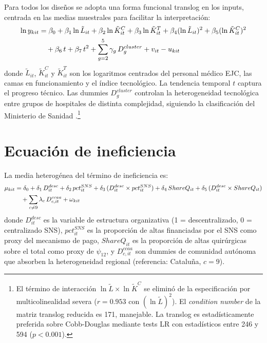 Para todos los diseños se adopta una forma funcional translog en los inputs, centrada en las medias muestrales para facilitar la interpretación:
\begin{align}
  \ln y_{kit} &= \beta_0
    + \beta_1 \ln\tilde{L}_{it}
    + \beta_2 \ln\tilde{K}^C_{it}
    + \beta_3 \ln\tilde{K}^T_{it}
    + \beta_4 (\ln\tilde{L}_{it})^2
    + \beta_5 (\ln\tilde{K}^C_{it})^2
    \notag \\
    &\quad
    + \beta_6\, t
    + \beta_7\, t^2
    + \sum_{g=2}^{5} \gamma_g\, D^{cluster}_g
    + v_{it} - u_{kit}
  \label{eq:frontera_tl}
\end{align}
donde $\tilde{L}_{it}$, $\tilde{K}^C_{it}$ y $\tilde{K}^T_{it}$ son los logaritmos centrados del personal médico EJC, las camas en funcionamiento y el índice tecnológico. La tendencia temporal $t$ captura el progreso técnico. Las dummies $D^{cluster}_g$ controlan la heterogeneidad tecnológica entre grupos de hospitales de distinta complejidad, siguiendo la clasificación del Ministerio de Sanidad \citep{ministerio2007}.\footnote{El término de interacción $\ln\tilde{L}\times\ln\tilde{K}^C$ se eliminó de la especificación por multicolinealidad severa ($r=0.953$ con $(\ln\tilde{L})^2$). El \textit{condition number} de la matriz translog reducida es 171, manejable. La translog es estadísticamente preferida sobre Cobb-Douglas mediante tests LR con estadísticos entre 246 y 594 ($p<0.001$).}

\section{Ecuación de ineficiencia}
\label{sec:ecuacion_inef}

La media heterogénea del término de ineficiencia es:
\begin{align}
  \mu_{kit} &= \delta_0
    + \delta_1\, D^{desc}_{it}
    + \delta_2\, pct^{SNS}_{it}
    + \delta_3\, (D^{desc}_{it} \times pct^{SNS}_{it})
    + \delta_4\, ShareQ_{it}
    + \delta_5\, (D^{desc}_{it} \times ShareQ_{it})
    \notag \\
    &\quad + \sum_{c \neq 9} \lambda_c\, D^{ccaa}_{c,it}
    + \omega_{kit}
  \label{eq:uhet}
\end{align}
donde $D^{desc}_{it}$ es la variable de estructura organizativa (1 = descentralizado, 0 = centralizado SNS), $pct^{SNS}_{it}$ es la proporción de altas financiadas por el SNS como proxy del mecanismo de pago, $ShareQ_{it}$ es la proporción de altas quirúrgicas sobre el total como proxy de $\psi_{12}$, y $D^{ccaa}_{c,it}$ son dummies de comunidad autónoma que absorben la heterogeneidad regional (referencia: Cataluña, $c=9$).

